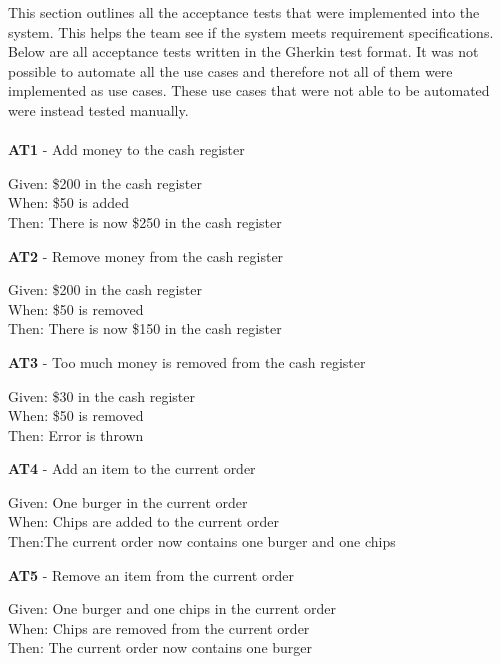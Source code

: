 This section outlines all the acceptance tests that were implemented into the system. This helps the team see if the system meets requirement specifications. Below are all acceptance tests written in the Gherkin test format. It was not possible to automate all the use cases and therefore not all of them were implemented as use cases. These use cases that were not able to be automated were instead tested manually.\\
\\
\textbf{AT1} - Add money to the cash register \\
\begin{small}
Given: \$200 in the cash register\\
When: \$50 is added\\
Then: There is now \$250 in the cash register\\
\end{small}
\linebreak
\noindent \textbf{AT2} - Remove money from the cash register\\
\begin{small}
Given: \$200 in the cash register\\
When: \$50 is removed\\
Then: There is now \$150 in the cash register\\
\end{small}
\linebreak
\textbf{AT3} - Too much money is removed from the cash register\\
\begin{small}
Given: \$30 in the cash register\\
When: \$50 is removed\\
Then: Error is thrown\\
\end{small}
\linebreak
\textbf{AT4} - Add an item to the current order\\
\begin{small}
Given: One burger in the current order\\
When: Chips are added to the current order\\
Then:The current order now contains one burger and one chips\\
\end{small}
\linebreak
\textbf{AT5} - Remove an item from the current order\\
\begin{small}
Given: One burger and one chips in the current order\\
When: Chips are removed from the current order\\
Then: The current order now contains one burger\\
\end{small}
